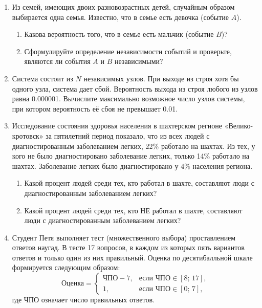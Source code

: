 \documentclass[12pt, a4paper]{article}\usepackage[]{graphicx}\usepackage[]{color}
\begin{document}
						\begin{enumerate}
							\item  Из семей, имеющих двоих разновозрастных детей, случайным образом выбирается одна семья. Известно, что в семье есть девочка (событие $A$).

							\begin{enumerate}
								\item	Какова вероятность того, что в семье есть мальчик (событие $B$)?

								\item	Сформулируйте определение независимости событий и проверьте, являются ли события $A$ и $B$ независимыми?
							\end{enumerate}

							\item  Система состоит из $N$ независимых узлов. При выходе из строя хотя бы одного узла, система дает сбой. Вероятность выхода из строя любого из узлов равна 0.000001. Вычислите максимально возможное число узлов системы, при котором вероятность её сбоя не превышает 0.01.

							\item  Исследование состояния здоровья населения в шахтерском регионе «Велико-кротовск» за пятилетний период показало, что из всех людей с диагностированным заболеванием легких, 22\% работало на шахтах. Из тех, у кого не было диагностировано заболевание легких, только 14\% работало на шахтах. Заболевание легких было диагностировано у 4\% населения региона.

							\begin{enumerate}
								\item	Какой процент людей среди тех, кто работал в шахте, составляют люди с диагностированным заболеванием легких?

								\item	Какой процент людей среди тех, кто НЕ работал в шахте, составляют люди с диагностированным заболеванием легких?
							\end{enumerate}

							\item  Студент Петя выполняет тест (множественного выбора) проставлением ответов наугад. В тесте 17 вопросов, в каждом из которых пять вариантов ответов и только один из них правильный. Оценка по десятибалльной шкале формируется следующим образом:
							\[
							\text{Оценка} = \left\{
							\begin{array}{ll}
							\text{ЧПО} - 7, & \text{если $\text{ЧПО}\in [8;\,17]$,} \\
							1,              & \text{если $\text{ЧПО}\in [0;\,7]$,}
							\end{array}
							\right.
							\]
							где ЧПО означает число правильных ответов.


\end{enumerate}
\end{document}
